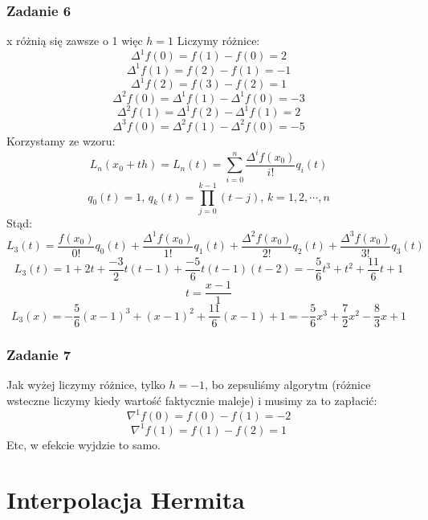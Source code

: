 \documentclass[a4paper]{article}
\begin{document}
\subsubsection*{Zadanie 6}
x różnią się zawsze o 1 więc $h=1$
Liczymy różnice:
$$\Delta^1 f(0) = f(1) - f(0) = 2 $$
$$\Delta^1 f(1) = f(2) - f(1) = -1 $$
$$\Delta^1 f(2) = f(3) - f(2) = 1 $$
$$\Delta^2 f(0) = \Delta^1 f(1) - \Delta^1 f(0) = -3$$
$$\Delta^2 f(1) = \Delta^1 f(2) - \Delta^1 f(1) = 2$$
$$\Delta^3 f(0) = \Delta^2 f(1) - \Delta^2 f(0) = -5$$
Korzystamy ze wzoru:
$$L_n(x_0+th) = L_n(t) = \sum_{i=0}^n\frac{\Delta^if(x_0)}{i!}q_i(t)$$
$$q_0(t) = 1\text{,\ \ }q_k(t)=\prod_{j=0}^{k-1}(t-j)\text{,\ \ }k=1,2,\cdots,n$$
Stąd:
$$L_3(t) = \frac{f(x_0)}{0!}q_0(t) + \frac{\Delta^1f(x_0)}{1!}q_1(t) + \frac{\Delta^2f(x_0)}{2!}q_2(t) + \frac{\Delta^3f(x_0)}{3!}q_3(t)$$
$$L_3(t) = 1 + 2t + \frac{-3}{2}t(t-1) + \frac{-5}{6}t(t-1)(t-2) = -\frac{5}{6}t^3+t^2+\frac{11}{6}t+1$$
$$t = \frac{x-1}{1}$$
$$L_3(x) = -\frac{5}{6}(x-1)^3+(x-1)^2+\frac{11}{6}(x-1)+1 = -\frac{5}{6}x^3+\frac{7}{2}x^2-\frac{8}{3}x+1$$

\subsubsection*{Zadanie 7}
Jak wyżej liczymy różnice, tylko $h=-1$, bo zepsuliśmy algorytm (różnice wsteczne liczymy kiedy wartość faktycznie maleje) i musimy za to zapłacić:
$$\nabla^1 f(0) = f(0) - f(1) = -2$$
$$\nabla^1 f(1) = f(1) - f(2) = 1$$
Etc, w efekcie wyjdzie to samo.

\section{Interpolacja Hermita}
\end{document}
